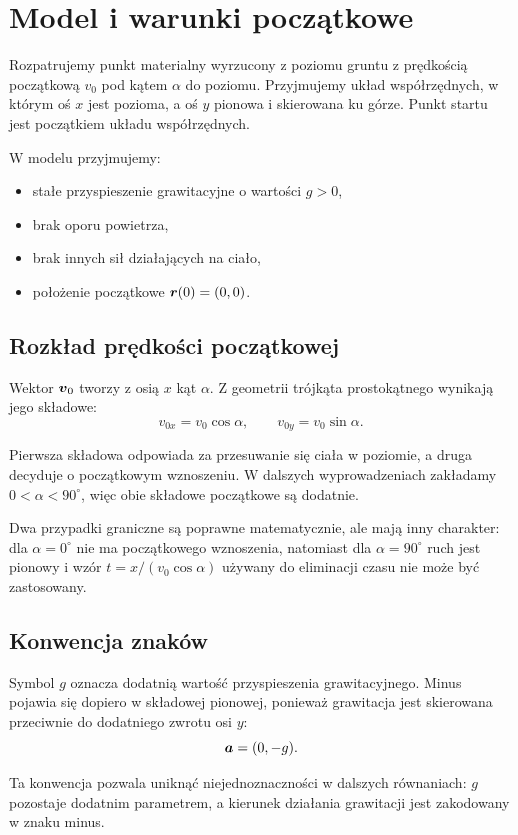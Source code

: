 \section{Model i warunki początkowe}

Rozpatrujemy punkt materialny wyrzucony z poziomu gruntu z prędkością
początkową \(v_0\) pod kątem \(\alpha\) do poziomu. Przyjmujemy układ
współrzędnych, w którym oś \(x\) jest pozioma, a oś \(y\) pionowa i skierowana
ku górze. Punkt startu jest początkiem układu współrzędnych.

W modelu przyjmujemy:
\begin{itemize}
  \item stałe przyspieszenie grawitacyjne o wartości \(g>0\),
  \item brak oporu powietrza,
  \item brak innych sił działających na ciało,
  \item położenie początkowe \(\boldsymbol{r}(0)=(0,0)\).
\end{itemize}

\subsection{Rozkład prędkości początkowej}

Wektor \(\boldsymbol{v}_0\) tworzy z osią \(x\) kąt \(\alpha\). Z geometrii trójkąta
prostokątnego wynikają jego składowe:
\[
v_{0x}=v_0\cos\alpha,
\qquad
v_{0y}=v_0\sin\alpha.
\]

Pierwsza składowa odpowiada za przesuwanie się ciała w poziomie, a druga
decyduje o początkowym wznoszeniu. W dalszych wyprowadzeniach zakładamy
\(0<\alpha<90^\circ\), więc obie składowe początkowe są dodatnie.

Dwa przypadki graniczne są poprawne matematycznie, ale mają inny charakter:
dla \(\alpha=0^\circ\) nie ma początkowego wznoszenia, natomiast dla
\(\alpha=90^\circ\) ruch jest pionowy i wzór
\(t=x/(v_0\cos\alpha)\) używany do eliminacji czasu nie może być zastosowany.

\subsection{Konwencja znaków}

Symbol \(g\) oznacza dodatnią wartość przyspieszenia grawitacyjnego.
Minus pojawia się dopiero w składowej pionowej, ponieważ grawitacja jest
skierowana przeciwnie do dodatniego zwrotu osi \(y\):
\[
\boldsymbol{a}=(0,-g).
\]

Ta konwencja pozwala uniknąć niejednoznaczności w dalszych równaniach:
\(g\) pozostaje dodatnim parametrem, a kierunek działania grawitacji jest
zakodowany w znaku minus.
